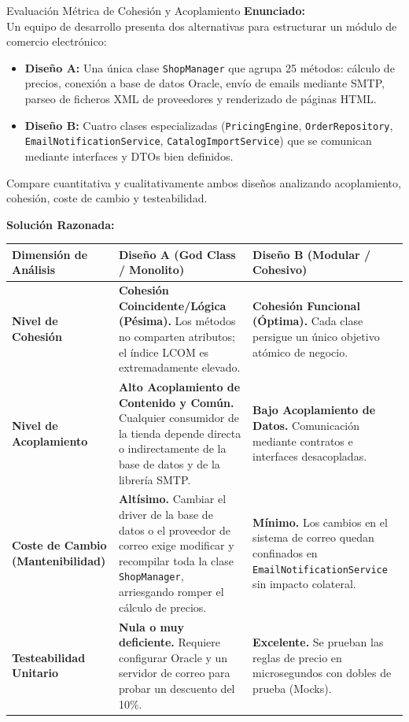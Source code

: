 \begin{ejercicioresuelto}{Evaluación Métrica de Cohesión y Acoplamiento}
\textbf{Enunciado:}\\
Un equipo de desarrollo presenta dos alternativas para estructurar un módulo de comercio electrónico:
\begin{itemize}
  \item \textbf{Diseño A:} Una única clase \texttt{ShopManager} que agrupa 25 métodos: cálculo de precios, conexión a base de datos Oracle, envío de emails mediante SMTP, parseo de ficheros XML de proveedores y renderizado de páginas HTML.
  \item \textbf{Diseño B:} Cuatro clases especializadas (\texttt{PricingEngine}, \texttt{OrderRepository}, \texttt{EmailNotificationService}, \texttt{CatalogImportService}) que se comunican mediante interfaces y DTOs bien definidos.
\end{itemize}
Compare cuantitativa y cualitativamente ambos diseños analizando acoplamiento, cohesión, coste de cambio y testeabilidad.

\vspace{0.5em}
\textbf{Solución Razonada:}

\vspace{0.5em}
\begin{center}
\small
\begin{tabularx}{\linewidth}{l X X}
\toprule
\textbf{Dimensión de Análisis} & \textbf{Diseño A (God Class / Monolito)} & \textbf{Diseño B (Modular / Cohesivo)} \\
\midrule
\textbf{Nivel de Cohesión} & \textbf{Cohesión Coincidente/Lógica (Pésima).} Los métodos no comparten atributos; el índice LCOM es extremadamente elevado. & \textbf{Cohesión Funcional (Óptima).} Cada clase persigue un único objetivo atómico de negocio. \\
\addlinespace
\textbf{Nivel de Acoplamiento} & \textbf{Alto Acoplamiento de Contenido y Común.} Cualquier consumidor de la tienda depende directa o indirectamente de la base de datos y de la librería SMTP. & \textbf{Bajo Acoplamiento de Datos.} Comunicación mediante contratos e interfaces desacopladas. \\
\addlinespace
\textbf{Coste de Cambio (Mantenibilidad)} & \textbf{Altísimo.} Cambiar el driver de la base de datos o el proveedor de correo exige modificar y recompilar toda la clase \texttt{ShopManager}, arriesgando romper el cálculo de precios. & \textbf{Mínimo.} Los cambios en el sistema de correo quedan confinados en \texttt{EmailNotificationService} sin impacto colateral. \\
\addlinespace
\textbf{Testeabilidad Unitario} & \textbf{Nula o muy deficiente.} Requiere configurar Oracle y un servidor de correo para probar un descuento del 10\%. & \textbf{Excelente.} Se prueban las reglas de precio en microsegundos con dobles de prueba (Mocks). \\
\bottomrule
\end{tabularx}
\end{center}
\end{ejercicioresuelto}

